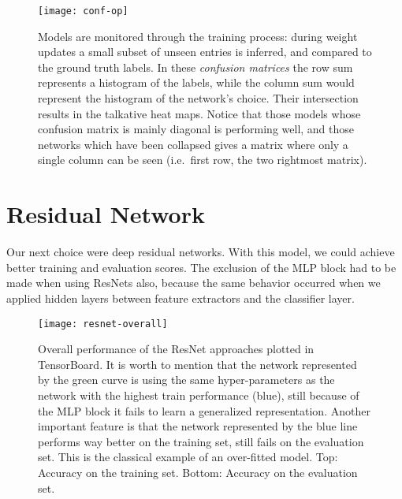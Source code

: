 \begin{figure}
  \centering
  \texttt{[image: conf-op]}
  \caption{Models are monitored through the training process: during weight updates a small subset of unseen entries is inferred, and compared to the ground truth labels. In these \textit{confusion matrices} the row sum represents a histogram of the labels, while the column sum would represent the histogram of the network's choice. Their intersection results in the talkative heat maps. Notice that those models whose confusion matrix is mainly diagonal is performing well, and those networks which have been collapsed gives a matrix where only a single column can be seen (i.e.~first row, the two rightmost matrix).}
  \label{fig:conf-op}
\end{figure}

\section{Residual Network}
Our next choice were deep residual networks.
With this model, we could achieve better training and evaluation scores.
The exclusion of the MLP block had to be made when using ResNets also, because the same behavior occurred when we applied hidden layers between feature extractors and the classifier layer.

\begin{figure}[h]
  \centering
  \texttt{[image: resnet-overall]}
  \caption{Overall performance of the ResNet approaches plotted in TensorBoard. It is worth to mention that the network represented by the green curve is using the same hyper-parameters as the network with the highest train performance (blue), still because of the MLP block it fails to learn a generalized representation. Another important feature is that the network represented by the blue line performs way better on the training set, still fails on the evaluation set. This is the classical example of an over-fitted model. Top: Accuracy on the training set. Bottom: Accuracy on the evaluation set.}
  \label{fig:resnet-overall}
\end{figure}
